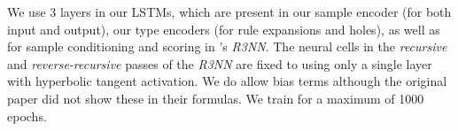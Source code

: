 \documentclass{article}
\begin{document}

We use $3$ layers in our LSTMs, which are present in our sample encoder
(for both input and output), our type encoders (for rule expansions and holes),
as well as for sample conditioning and scoring in \citet{nsps}'s \emph{R3NN}.
The neural cells in the \emph{recursive} and \emph{reverse-recursive}
passes of the \emph{R3NN} are fixed to using only a single layer with hyperbolic tangent activation.
We do allow bias terms although the original paper did not show these in their formulas.
We train for a maximum of 1000 epochs.
\end{document}
